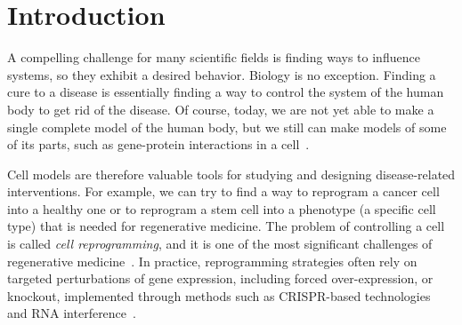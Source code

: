 
\chapter{Introduction}
\label{chapter:introduction}

A compelling challenge for many scientific fields is finding ways to influence systems, so they exhibit a desired behavior. Biology is no exception. Finding a cure to a disease is essentially finding a way to control the system of the human body to get rid of the disease. Of course, today, we are not yet able to make a single complete model of the human body, but we still can make models of some of its parts, such as gene-protein interactions in a cell~\cite{Cardelli2005}. 

Cell models are therefore valuable tools for studying and designing disease-related interventions. For example, we can try to find a way to reprogram a cancer cell into a healthy one or to reprogram a stem cell into a phenotype (a specific cell type) that is needed for regenerative medicine. The problem of controlling a cell is called \emph{cell reprogramming}, and it is one of the most significant challenges of regenerative medicine~\cite{Cherry2012}. In practice, reprogramming strategies often rely on targeted perturbations of gene expression, including forced over-expression, or knockout, implemented through methods such as CRISPR-based technologies~\cite{Doudna2014} and RNA interference~\cite{Fire1998}.




